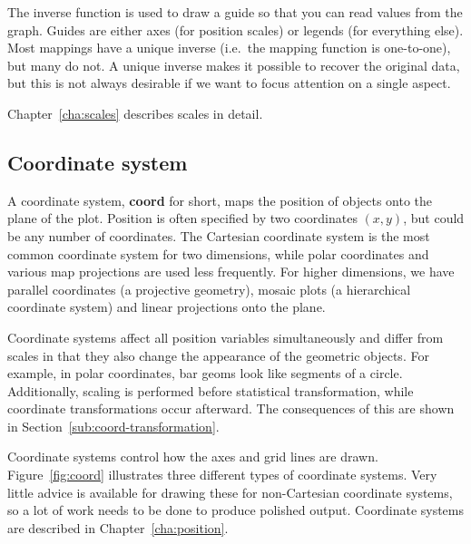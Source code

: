 The inverse function is used to draw a guide so that you can read values from the graph.  Guides are either axes (for position scales) or legends (for everything else).  Most mappings have a unique inverse (i.e.\ the mapping function is one-to-one), but many do not.  A unique inverse makes it possible to recover the original data, but this is not always desirable if we want to focus attention on a single aspect.

Chapter~\ref{cha:scales} describes scales in detail.

\subsection{Coordinate system}\label{sec:coordinate_systems}

A coordinate system, {\bf coord} for short, maps the position of objects onto the plane of the plot.  Position is often specified by two coordinates $(x, y)$, but could be any number of coordinates.  The Cartesian coordinate system is the most common coordinate system for two dimensions, while polar coordinates and various map projections are used less frequently.  For higher dimensions, we have parallel coordinates (a projective geometry), mosaic plots (a hierarchical coordinate system) and linear projections onto the plane.

Coordinate systems affect all position variables simultaneously and differ from scales in that they also change the appearance of the geometric objects.  For example, in polar coordinates, bar geoms look like segments of a circle.  Additionally, scaling is performed before statistical transformation, while coordinate transformations occur afterward.  The consequences of this are shown in Section~\ref{sub:coord-transformation}.

Coordinate systems control how the axes and grid lines are drawn.  Figure~\ref{fig:coord} illustrates three different types of coordinate systems.  Very little advice is available for drawing these for non-Cartesian coordinate systems, so a lot of work needs to be done to produce polished output.  Coordinate systems are described in Chapter~\ref{cha:position}.

% 


